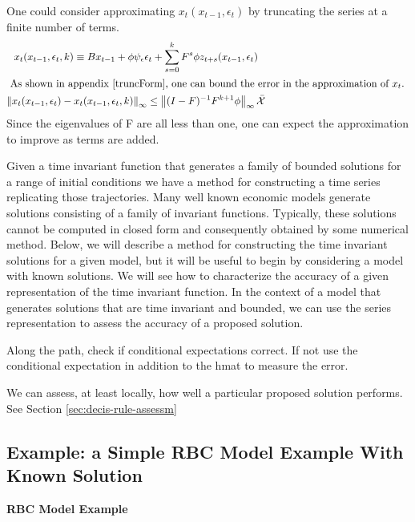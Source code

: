 \documentclass[12pt]{article}
\begin{document}
One could consider approximating $x_t(x_{t-1},\epsilon_t)$ by 
truncating the series at a finite number of terms.
 	 \begin{gather}
 	 x_{t}(x_{t-1},\epsilon_t,k) \equiv B x_{t-1}+ \phi \psi_\epsilon\epsilon_t + \sum_{s=0}^k F^s \phi z_{t+s}(x_{t-1},\epsilon_t)  \label{theTruncSeries}\\ %
\intertext{
 As shown in appendix \refeq{truncForm}, one can bound the error in the 
approximation of $x_t$.
}
 	\infNorm{x_{t}(x_{t-1},\epsilon_t) -x_{t}(x_{t-1},\epsilon_t,k)} \le 
  \infNorm{ (I -F)^{-1} F^{k+1}\phi} \bar{\mathcal{X}}
 \end{gather}
Since the eigenvalues of F are all less than one, one can expect the approximation to improve as terms are added.


Given a time invariant function that generates a family of bounded solutions for a range of initial conditions we have a method for constructing a time series
replicating those trajectories.  
Many well known economic models generate solutions consisting of
a family of invariant functions.
Typically, these solutions cannot be computed in closed form and consequently
obtained by some numerical method.
Below, we will describe a method for constructing the time invariant solutions
for a given model, but 
it will be useful to begin by considering a model with known solutions.
We will see how to characterize the accuracy of a given representation of the time invariant function.  In the context of a model that generates
solutions that are time invariant and bounded, we can use the 
series representation to  assess the accuracy of a proposed solution.

Along the path, check if conditional expectations correct.  If not use the conditional expectation in addition to the hmat to measure the error.

We can assess, at least locally, 
how well a particular proposed solution performs.  
See Section \ref{sec:decis-rule-assessm}


\subsection{Example: a Simple RBC Model Example With Known Solution}
\label{sec:simple-rbc-model-2}


 {\bf RBC Model Example}
  
\end{document}
